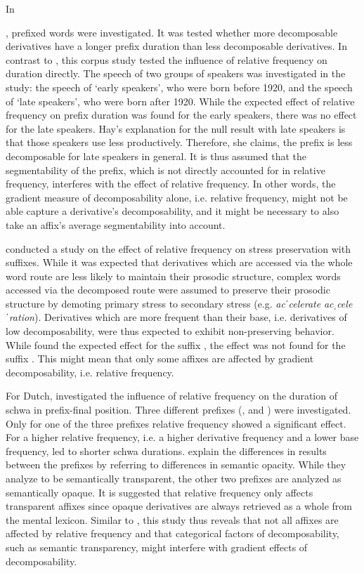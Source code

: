 In {\citet{Hay.2007},  prefixed words were investigated. It was tested whether more decomposable derivatives have a longer prefix duration than less decomposable  derivatives.  In contrast to \cite{Hay.2003}, this corpus study tested the influence of relative frequency on duration directly. The speech of two groups of speakers was investigated in the study: the speech of `early speakers', who were born before 1920, and the speech of `late speakers', who were born after 1920. 
While the expected effect of relative frequency on prefix duration was found for the early speakers, there was no effect  for the late speakers. Hay's explanation for the null result with late speakers is that those speakers use  less productively. Therefore, she claims, the prefix is less decomposable for late speakers in general. It is thus assumed that the segmentability of the prefix, which is not directly accounted for in relative frequency, interferes with the effect of relative frequency. In other words, the gradient measure of decomposability alone, i.e. relative frequency, might not be able capture a derivative's decomposability, and it might be necessary to also take an affix's average segmentability into account.
 
 \cite{Collie.2008} conducted a study on the effect of relative frequency on stress preservation with suffixes. While it was expected that derivatives which are accessed via the whole word route are less likely to maintain their prosodic structure, complex words accessed via the decomposed route were assumed to preserve their prosodic structure by demoting primary stress to secondary stress (e.g. \textit{acˈcelerate} \textendash  \textit{acˌceleˈration}). Derivatives which are more frequent than their base, i.e. derivatives of low decomposability, were thus expected to exhibit non-preserving behavior. While \cite{Collie.2008} found the expected effect for the suffix , the effect was not found for the suffix . This might mean that only some affixes are affected by gradient decomposability, i.e. relative frequency.
 	
 For Dutch, \cite{Hanique.2011} investigated the influence of relative frequency on the duration of schwa in prefix-final position. Three different prefixes (,  and ) were investigated. Only for one of the three prefixes relative frequency showed a significant effect. For  a higher relative frequency, i.e. a higher derivative frequency and a lower base frequency, led to shorter schwa durations.
 \cite{Hanique.2011} explain the differences in results between the prefixes by referring to differences in semantic opacity. While they analyze  to be semantically transparent, the other two prefixes are analyzed as semantically opaque. It is suggested that relative frequency only affects transparent affixes since opaque derivatives are always  retrieved as a whole from the mental lexicon. Similar to \cite{Collie.2008}, this study thus reveals that not all affixes are affected by relative frequency and that categorical factors of decomposability, such as semantic transparency, might interfere with gradient effects of decomposability. 


}
